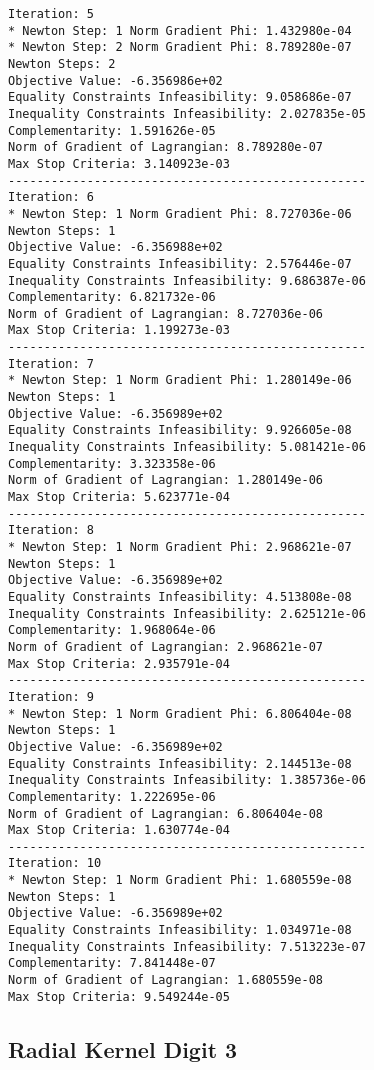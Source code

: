 \documentclass{article}
\begin{document}
\begin{minipage}[t]{0.45\textwidth}
\begin{verbatim}
Iteration: 5
* Newton Step: 1 Norm Gradient Phi: 1.432980e-04
* Newton Step: 2 Norm Gradient Phi: 8.789280e-07
Newton Steps: 2
Objective Value: -6.356986e+02
Equality Constraints Infeasibility: 9.058686e-07
Inequality Constraints Infeasibility: 2.027835e-05
Complementarity: 1.591626e-05
Norm of Gradient of Lagrangian: 8.789280e-07
Max Stop Criteria: 3.140923e-03
--------------------------------------------------
Iteration: 6
* Newton Step: 1 Norm Gradient Phi: 8.727036e-06
Newton Steps: 1
Objective Value: -6.356988e+02
Equality Constraints Infeasibility: 2.576446e-07
Inequality Constraints Infeasibility: 9.686387e-06
Complementarity: 6.821732e-06
Norm of Gradient of Lagrangian: 8.727036e-06
Max Stop Criteria: 1.199273e-03
--------------------------------------------------
Iteration: 7
* Newton Step: 1 Norm Gradient Phi: 1.280149e-06
Newton Steps: 1
Objective Value: -6.356989e+02
Equality Constraints Infeasibility: 9.926605e-08
Inequality Constraints Infeasibility: 5.081421e-06
Complementarity: 3.323358e-06
Norm of Gradient of Lagrangian: 1.280149e-06
Max Stop Criteria: 5.623771e-04
--------------------------------------------------
Iteration: 8
* Newton Step: 1 Norm Gradient Phi: 2.968621e-07
Newton Steps: 1
Objective Value: -6.356989e+02
Equality Constraints Infeasibility: 4.513808e-08
Inequality Constraints Infeasibility: 2.625121e-06
Complementarity: 1.968064e-06
Norm of Gradient of Lagrangian: 2.968621e-07
Max Stop Criteria: 2.935791e-04
--------------------------------------------------
Iteration: 9
* Newton Step: 1 Norm Gradient Phi: 6.806404e-08
Newton Steps: 1
Objective Value: -6.356989e+02
Equality Constraints Infeasibility: 2.144513e-08
Inequality Constraints Infeasibility: 1.385736e-06
Complementarity: 1.222695e-06
Norm of Gradient of Lagrangian: 6.806404e-08
Max Stop Criteria: 1.630774e-04
--------------------------------------------------
Iteration: 10
* Newton Step: 1 Norm Gradient Phi: 1.680559e-08
Newton Steps: 1
Objective Value: -6.356989e+02
Equality Constraints Infeasibility: 1.034971e-08
Inequality Constraints Infeasibility: 7.513223e-07
Complementarity: 7.841448e-07
Norm of Gradient of Lagrangian: 1.680559e-08
Max Stop Criteria: 9.549244e-05
\end{verbatim}
\end{minipage}

\subsection{Radial Kernel Digit 3}\label{radial3}
\end{document}
